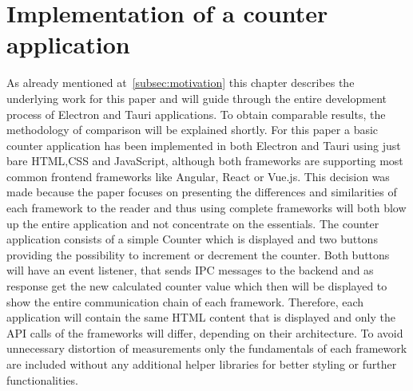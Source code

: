 \section{Implementation of a counter \\ application}
\label{sec:implementation}
As already mentioned at~\ref{subsec:motivation} this chapter describes the underlying work for this paper and will guide through the entire development process of Electron and Tauri applications.
To obtain comparable results, the methodology of comparison will be explained shortly.
For this paper a basic counter application has been implemented in both Electron and Tauri using just bare \ac{HTML},\ac{CSS} and JavaScript, although both frameworks are supporting most common frontend frameworks like Angular, React or Vue.js.
This decision was made because the paper focuses on presenting the differences and similarities of each framework to the reader and thus using complete frameworks will both blow up the entire application and not concentrate on the essentials.
The counter application consists of a simple Counter which is displayed and two buttons providing the possibility to increment or decrement the counter.
Both buttons will have an event listener, that sends \ac{IPC} messages to the backend and as response get the new calculated counter value which then will be displayed to show the entire communication chain of each framework.
Therefore, each application will contain the same \ac{HTML} content that is displayed and only the \ac{API} calls of the frameworks will differ, depending on their architecture.
To avoid unnecessary distortion of measurements only the fundamentals of each framework are included without any additional helper libraries for better styling or further functionalities.


